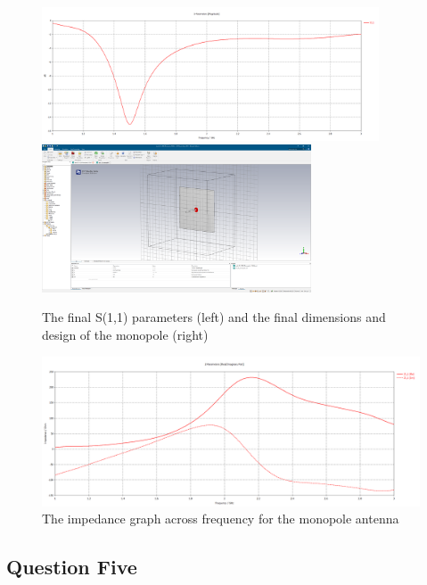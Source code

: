 \documentclass[colorlinks,11pt,a4paper,normalphoto,withhyper,ragged2e]{altareport}
\begin{document}
\begin{figure}[h!]
	\centering
	\hspace{\fill}\includegraphics[width=10cm,valign=c]{Images/qw-lambda-177.8-S1,1.png}\hspace{\fill}\includegraphics[width=8cm,valign=c]{Images/qw-final-dimens.png}\hspace{\fill}
	\caption{The final S(1,1) parameters (left) and the final dimensions and design of the monopole (right)}
	\label{fig:qw_s11_dimesions_final}
\end{figure}

\begin{figure}[h]
	\centering
	\hspace{\fill}\includegraphics[width=14cm,valign=c]{Images/qw-real-imag-impedance.png}\hspace{\fill}
	\caption{The impedance graph across frequency for the monopole antenna}  %
	\label{fig:qw_impedance}
\end{figure}

\newpage




\subsection{Question Five}
\end{document}

